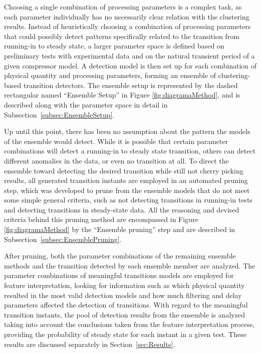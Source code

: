 \documentclass[preprint,11pt,number]{elsarticle}
\begin{document}
Choosing a single combination of processing parameters is a complex task, as each parameter individually has no necessarily clear relation with the clustering results. Instead of heuristically choosing a combination of processing parameters that could possibly detect patterns specifically related to the transition from running-in to steady state, a larger parameter space is defined based on preliminary tests with experimental data and on the natural transient period of a given compressor model. A detection model is then set up for each combination of physical quantity and processing parameters, forming an ensemble of clustering-based transition detectors. The ensemble setup is represented by the dashed rectangular named ``Ensemble Setup'' in Figure \ref{fig:diagramaMethod}, and is described along with the parameter space in detail in Subsection~\ref{subsec:EnsembleSetup}.

Up until this point, there has been no assumption about the pattern the models of the ensemble would detect. While it is possible that certain parameter combinations will detect a running-in to steady state transition, others can detect different anomalies in the data, or even no transition at all. To direct the ensemble toward detecting the desired transition while still not cherry picking results, all generated transition instants are employed in an automated pruning step, which was developed to prune from the ensemble models that do not meet some simple general criteria, such as not detecting transitions in running-in tests and detecting transitions in steady-state data. All the reasoning and devised criteria behind this pruning method are encompassed in Figure \ref{fig:diagramaMethod} by the ``Ensemble pruning'' step and are described in Subsection~\ref{subsec:EnsemblePruning}.

After pruning, both the parameter combinations of the remaining ensemble methods and the transition detected by each ensemble member are analyzed. The parameter combinations of meaningful transitions models are employed for feature interpretation, looking for information such as which physical quantity resulted in the most valid detection models and how much filtering and delay parameters affected the detection of transitions. With regard to the meaningful transition instants, the pool of detection results from the ensemble is analyzed taking into account the conclusions taken from the feature interpretation process, providing the probability of steady state for each instant in a given test. These results are discussed separately in Section~\ref{sec:Results}.
\end{document}
